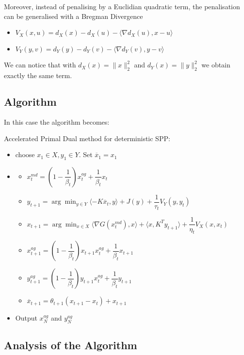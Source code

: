 \documentclass[12pt,reqno]{amsart}
\numberwithin{equation}{section}
\begin{document}
Moreover, instead of penalising by a Euclidian quadratic term, the penalisation can be generalised with a Bregman Divergence

\begin{itemize}
\item $V_{X}(x,u) = d_{X}(x) -  d_{X}(u) - \langle \nabla d_{X}(u),x - u \rangle$
\item $V_{Y}(y,v) = d_{Y}(y) -  d_{Y}(v) - \langle \nabla d_{Y}(v),y - v \rangle$
\end{itemize}

We can notice that with $d_{X}(x) = \lVert x \rVert_{2}^{2}$ and $d_{Y}(x) = \lVert y \rVert_{2}^{2}$ we obtain exactly the same term.

\subsection{Algorithm}

In this case the algorithm becomes:

Accelerated Primal Dual method for deterministic SPP:
\begin{itemize}
\item choose $x_{1} \in X, y_{1} \in Y$. Set $\overline{x}_{1} = x_{1}$
\item

\begin{itemize}
\item $x_{t}^{md} = (1 - \dfrac{1}{\beta_{t}})x_{t}^{ag} +  \dfrac{1}{\beta_{t}}x_{t}$
\item $y_{t+1} = \arg\min_{y \in Y} \langle -K\overline{x}_{t},y\rangle + J(y) + \dfrac{1}{\tau_{t}}V_{Y}(y,y_{t})$
\item $x_{t+1} = \arg\min_{x \in X} \langle \nabla G(x_{t}^{md}) ,x \rangle + \langle x,K^{T}y_{t+1} \rangle + \dfrac{1}{\eta_{t}}V_{X}(x,x_{t})$
\item $x_{t+1}^{ag} = (1 -  \dfrac{1}{\beta_{t}})x_{t+1}x_{t}^{ag}+ \dfrac{1}{\beta_{t}}x_{t+1}$
\item $y_{t+1}^{ag} = (1 -  \dfrac{1}{\beta_{t}})y_{t+1}x_{t}^{ag}+ \dfrac{1}{\beta_{t}}y_{t+1}$
\item $\overline{x}_{t+1} = \theta_{t+1}(x_{t+1} - x_{t}) + x_{t+1}$
\end{itemize}

\item Output $x_{N}^{ag}$ and $y_{N}^{ag}$
\end{itemize}

\subsection{Analysis of the Algorithm}
\end{document}
